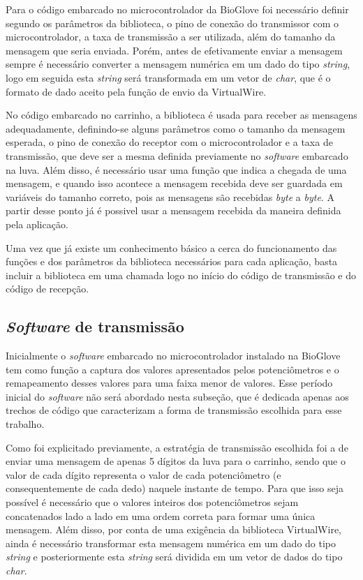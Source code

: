 \documentclass[
	12pt,				%
	openright,			%
	oneside,			%
	a4paper,			%
	english,			%
	brazil				%
	]{abntex2}
\begin{document}
		Para o código embarcado no microcontrolador da BioGlove foi necessário definir segundo os parâmetros da biblioteca, o pino de conexão do transmissor com o microcontrolador, a taxa de transmissão a ser utilizada, além do tamanho da mensagem que seria enviada. Porém, antes de efetivamente enviar a mensagem sempre é necessário converter a mensagem numérica em um dado do tipo \textit{string}, logo em seguida esta \textit{string} será transformada em um vetor de \textit{char}, que é o formato de dado aceito pela função de envio da VirtualWire.

		No código embarcado no carrinho, a biblioteca é usada para receber as mensagens adequadamente, definindo-se alguns parâmetros como o tamanho da mensagem esperada, o pino de conexão do receptor com o microcontrolador e a taxa de transmissão, que deve ser a mesma definida previamente no \textit{software} embarcado na luva. Além disso, é necessário usar uma função que indica a chegada de uma mensagem, e quando isso acontece a mensagem recebida deve ser guardada em variáveis do tamanho correto, pois as mensagens são recebidas \textit{byte} a \textit{byte}. A partir desse ponto já é possivel usar a mensagem recebida da maneira definida pela aplicação.

		Uma vez que já existe um conhecimento básico a cerca do funcionamento das funções e dos parâmetros da biblioteca necessários para cada aplicação, basta incluir a biblioteca em uma chamada logo no início do código de transmissão e do código de recepção.



		\subsection{\textit{Software} de transmissão}

		Inicialmente o \textit{software} embarcado no microcontrolador instalado na BioGlove tem como função a captura dos valores apresentados pelos potenciômetros e o remapeamento desses valores para uma faixa menor de valores. Esse período inicial do \textit{software} não será abordado nesta subseção, que é dedicada apenas aos trechos de código que caracterizam a forma de transmissão escolhida para esse trabalho.

		Como foi explicitado previamente, a estratégia de transmissão escolhida foi a de enviar uma mensagem de apenas 5 dígitos da luva para o carrinho, sendo que o valor de cada dígito representa o valor de cada potenciômetro (e consequentemente de cada dedo) naquele instante de tempo. Para que isso seja possível é necessário que o valores inteiros dos potenciômetros sejam concatenados lado a lado em uma ordem correta para formar uma única mensagem. Além disso, por conta de uma exigência da biblioteca VirtualWire, ainda é necessário transformar esta mensagem numérica em um dado do tipo \textit{string} e posteriormente esta \textit{string} será dividida em um vetor de dados do tipo \textit{char}.	
		
\end{document}
